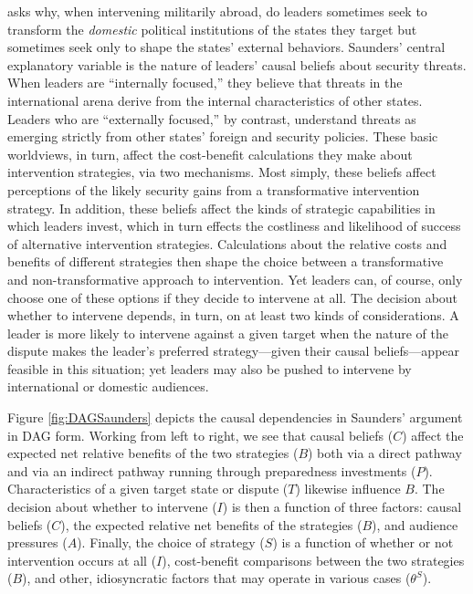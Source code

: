 \documentclass[
  12pt,
]{book}
\begin{document}
\citet{saunders2011leaders} asks why, when intervening militarily abroad, do leaders sometimes seek to transform the \emph{domestic} political institutions of the states they target but sometimes seek only to shape the states' external behaviors. Saunders' central explanatory variable is the nature of leaders' causal beliefs about security threats. When leaders are ``internally focused,'' they believe that threats in the international arena derive from the internal characteristics of other states. Leaders who are ``externally focused,'' by contrast, understand threats as emerging strictly from other states' foreign and security policies. These basic worldviews, in turn, affect the cost-benefit calculations they make about intervention strategies, via two mechanisms. Most simply, these beliefs affect perceptions of the likely security gains from a transformative intervention strategy. In addition, these beliefs affect the kinds of strategic capabilities in which leaders invest, which in turn effects the costliness and likelihood of success of alternative intervention strategies. Calculations about the relative costs and benefits of different strategies then shape the choice between a transformative and non-transformative approach to intervention. Yet leaders can, of course, only choose one of these options if they decide to intervene at all. The decision about whether to intervene depends, in turn, on at least two kinds of considerations. A leader is more likely to intervene against a given target when the nature of the dispute makes the leader's preferred strategy---given their causal beliefs---appear feasible in this situation; yet leaders may also be pushed to intervene by international or domestic audiences.

Figure \ref{fig:DAGSaunders} depicts the causal dependencies in Saunders' argument in DAG form. Working from left to right, we see that causal beliefs (\(C\)) affect the expected net relative benefits of the two strategies (\(B\)) both via a direct pathway and via an indirect pathway running through preparedness investments (\(P\)). Characteristics of a given target state or dispute (\(T\)) likewise influence \(B\). The decision about whether to intervene (\(I\)) is then a function of three factors: causal beliefs (\(C\)), the expected relative net benefits of the strategies (\(B\)), and audience pressures (\(A\)). Finally, the choice of strategy (\(S\)) is a function of whether or not intervention occurs at all (\(I\)), cost-benefit comparisons between the two strategies (\(B\)), and other, idiosyncratic factors that may operate in various cases (\(\theta^S\)).
\end{document}
